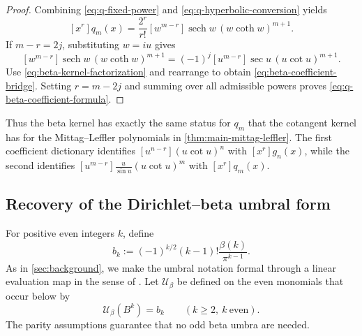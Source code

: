 \documentclass[11pt,twoside]{article}
\begin{document}

\begin{proof}
Combining \eqref{eq:q-fixed-power} and
\eqref{eq:q-hyperbolic-conversion} yields
\[
[x^r]q_m(x)
=\frac{2^r}{r!}
[w^{m-r}]\operatorname{sech}w\,(w\coth w)^{m+1}.
\]
If $m-r=2j$, substituting $w=iu$ gives
\[
[w^{m-r}]\operatorname{sech}w\,(w\coth w)^{m+1}
=(-1)^j
[u^{m-r}]\sec u\,(u\cot u)^{m+1}.
\]
Use \eqref{eq:beta-kernel-factorization} and rearrange to obtain
\eqref{eq:beta-coefficient-bridge}.  Setting $r=m-2j$ and summing over
all admissible powers proves \eqref{eq:q-beta-coefficient-formula}.
\end{proof}

Thus the beta kernel has exactly the same status for $q_m$ that the
cotangent kernel has for the Mittag--Leffler polynomials in
\cref{thm:main-mittag-leffler}.  The first coefficient dictionary identifies
\([u^{n-r}](u\cot u)^n\) with \([x^r]g_n(x)\), while the second identifies
\([u^{m-r}]\frac{u}{\sin u}(u\cot u)^m\) with \([x^r]q_m(x)\).

\subsection{Recovery of the Dirichlet--beta umbral form}

For positive even integers $k$, define
\begin{equation}
\label{eq:beta-umbra-values}
b_k
:=
(-1)^{k/2}(k-1)!\frac{\beta(k)}{\pi^{k-1}}.
\end{equation}
As in \cref{sec:background}, we make the umbral notation formal through
a linear evaluation map in the sense of \cite{Roman1984}.  Let
$\mathcal U_\beta$ be defined on the even monomials that occur below by
\begin{equation}
\label{eq:beta-umbra-evaluation}
\mathcal U_\beta(B^k)=b_k
\qquad(k\ge2,\ k\ \text{even}).
\end{equation}
The parity assumptions guarantee that no odd beta umbra are needed.
\end{document}
